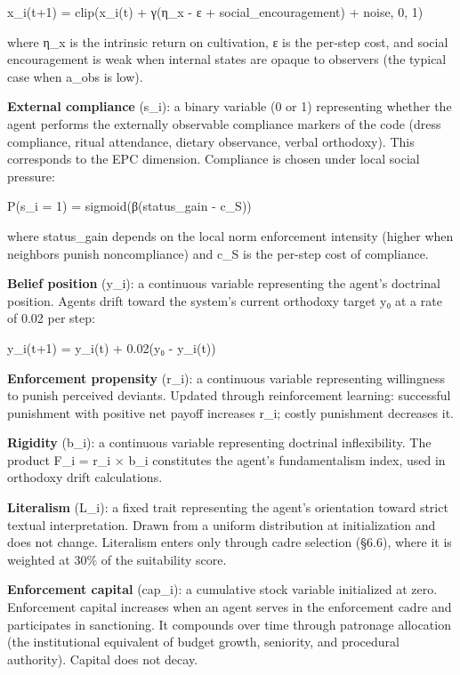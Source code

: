 \documentclass[12pt]{article}
\begin{document}
x\_i(t+1) = clip(x\_i(t) + γ(η\_x - ε + social\_encouragement) + noise, 0, 1)

where η\_x is the intrinsic return on cultivation, ε is the per-step cost, and social encouragement is weak when internal states are opaque to observers (the typical case when a\_obs is low).

\textbf{External compliance} (s\_i): a binary variable (0 or 1) representing whether the agent performs the externally observable compliance markers of the code (dress compliance, ritual attendance, dietary observance, verbal orthodoxy). This corresponds to the EPC dimension. Compliance is chosen under local social pressure:

P(s\_i = 1) = sigmoid(β(status\_gain - c\_S))

where status\_gain depends on the local norm enforcement intensity (higher when neighbors punish noncompliance) and c\_S is the per-step cost of compliance.

\textbf{Belief position} (y\_i): a continuous variable representing the agent's doctrinal position. Agents drift toward the system's current orthodoxy target y₀ at a rate of 0.02 per step:

y\_i(t+1) = y\_i(t) + 0.02(y₀ - y\_i(t))

\textbf{Enforcement propensity} (r\_i): a continuous variable representing willingness to punish perceived deviants. Updated through reinforcement learning: successful punishment with positive net payoff increases r\_i; costly punishment decreases it.

\textbf{Rigidity} (b\_i): a continuous variable representing doctrinal inflexibility. The product F\_i = r\_i × b\_i constitutes the agent's fundamentalism index, used in orthodoxy drift calculations.

\textbf{Literalism} (L\_i): a fixed trait representing the agent's orientation toward strict textual interpretation. Drawn from a uniform distribution at initialization and does not change. Literalism enters only through cadre selection (§6.6), where it is weighted at 30\% of the suitability score.

\textbf{Enforcement capital} (cap\_i): a cumulative stock variable initialized at zero. Enforcement capital increases when an agent serves in the enforcement cadre and participates in sanctioning. It compounds over time through patronage allocation (the institutional equivalent of budget growth, seniority, and procedural authority). Capital does not decay.

%
\end{document}
